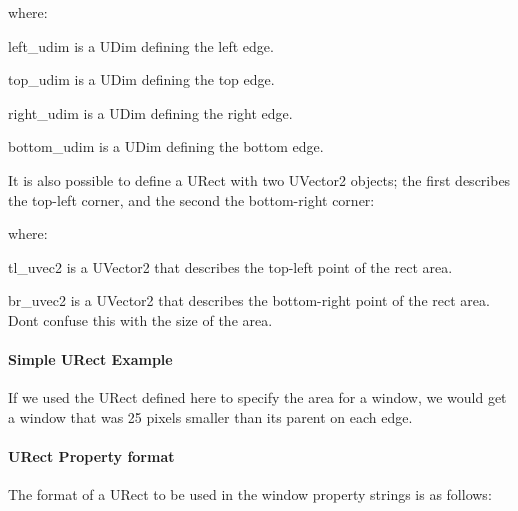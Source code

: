 where\+: \begin{DoxyItemize}
\item {\ttfamily \textquotesingle{}left\+\_\+udim\textquotesingle{}} is a U\+Dim defining the left edge. \item {\ttfamily \textquotesingle{}top\+\_\+udim\textquotesingle{}} is a U\+Dim defining the top edge. \item {\ttfamily \textquotesingle{}right\+\_\+udim\textquotesingle{}} is a U\+Dim defining the right edge. \item {\ttfamily \textquotesingle{}bottom\+\_\+udim\textquotesingle{}} is a U\+Dim defining the bottom edge.\end{DoxyItemize}
It is also possible to define a U\+Rect with two U\+Vector2 objects; the first describes the top-\/left corner, and the second the bottom-\/right corner\+: 
\begin{DoxyCode}{0}
\end{DoxyCode}


where\+: \begin{DoxyItemize}
\item {\ttfamily \textquotesingle{}tl\+\_\+uvec2\textquotesingle{}} is a U\+Vector2 that describes the top-\/left point of the rect area. \item {\ttfamily \textquotesingle{}br\+\_\+uvec2\textquotesingle{}} is a U\+Vector2 that describes the bottom-\/right point of the rect area. Don\textquotesingle{}t confuse this with the size of the area.\end{DoxyItemize}
\hypertarget{fal_intro_fal_urect_examples}{}\paragraph{Simple U\+Rect Example}\label{fal_intro_fal_urect_examples}

\begin{DoxyCode}{0}
\DoxyCodeLine{     )}
\end{DoxyCode}


If we used the U\+Rect defined here to specify the area for a window, we would get a window that was 25 pixels smaller than its parent on each edge.\hypertarget{fal_intro_fal_urect_prop_fmt}{}\paragraph{U\+Rect Property format}\label{fal_intro_fal_urect_prop_fmt}
The format of a U\+Rect to be used in the window property strings is as follows\+: 
\begin{DoxyCode}{0}
\end{DoxyCode}


